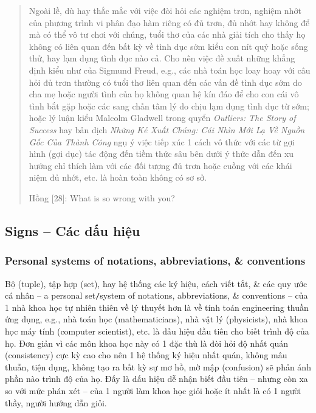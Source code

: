 \documentclass[12pt]{article}
\begin{document}
\begin{quotation}
	Ngoài lề, dù hay thắc mắc với việc đòi hỏi các nghiệm trơn, nghiệm nhớt của phương trình vi phân đạo hàm riêng có đủ trơn, đủ nhớt hay không để mà có thể vô tư chơi với chúng, tuổi thơ của các nhà giải tích cho thấy họ không có liên quan đến bất kỳ về tình dục sớm kiểu con nít quỷ hoặc sống thử, hay lạm dụng tình dục nào cả. Cho nên việc đề xuất những khẳng định kiểu như của {\sc Sigmund Freud}, e.g., các nhà toán học loay hoay với câu hỏi đủ trơn thường có tuổi thơ liên quan đến các vấn đề tình dục sớm do cha mẹ hoặc người tình của họ không quan hệ kín đáo để cho con cái vô tình bắt gặp hoặc các sang chấn tâm lý do chịu lạm dụng tình dục từ sớm; hoặc lý luận kiểu {\sc Malcolm Gladwell} trong quyển {\it Outliers: The Story of Success} \cite{Gladwell2008} hay bản dịch {\it Những Kẻ Xuất Chúng: Cái Nhìn Mới Lạ Về Nguồn Gốc Của Thành Công} \cite{Gladwell_outlier} ngụ ý việc tiếp xúc 1 cách vô thức với các từ gợi hình (gợi dục) tác động đến tiềm thức sâu bên dưới ý thức dẫn đến xu hướng chỉ thích làm với các đối tượng đủ trơn hoặc cuồng với các khái niệm đủ nhớt, etc. là hoàn toàn không có sơ sở.
	
	{\sf Hồng [28]}: What is so wrong with you?
\end{quotation}

\subsection{Signs -- Các dấu hiệu}

\subsubsection{Personal systems of notations, abbreviations, \& conventions}
Bộ (tuple), tập hợp (set), hay hệ thống các ký hiệu, cách viết tắt, \& các quy ước cá nhân -- a personal set{\tt/}system of notations, abbreviations, \& conventions -- của 1 nhà khoa học tự nhiên thiên về lý thuyết hơn là về tính toán engineering thuần ứng dụng, e.g., nhà toán học (mathematicians), nhà vật lý (physicists), nhà khoa học máy tính (computer scientist), etc. là dấu hiệu đầu tiên cho biết trình độ của họ. Đơn giản vì các môn khoa học này có 1 đặc thù là đòi hỏi độ nhất quán (consistency) cực kỳ cao cho nên 1 hệ thống ký hiệu nhất quán, không mâu thuẫn, tiện dụng, không tạo ra bất kỳ sự mơ hồ, mờ mập (confusion) sẽ phản ánh phần nào trình độ của họ. Đấy là dấu hiệu dễ nhận biết đầu tiên -- nhưng còn xa so với mức phán xét -- của 1 người làm khoa học giỏi hoặc ít nhất là có 1 người thầy, người hướng dẫn giỏi.
\end{document}
